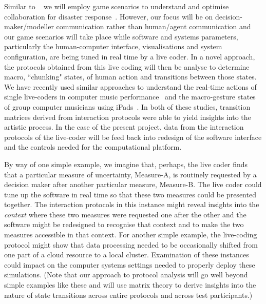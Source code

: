 \documentclass[a4paper,fontsize=12pt]{scrartcl}
\begin{document}
Similar to ~\parencite{ramchurn2016human} we will employ game scenarios to understand and optimise 
collaboration for disaster response~\parencite{ramchurn2016human}.
However, our focus will be on  decision-maker/modeller communication rather than human/agent communication and our game scenarios will take place while software and systems parameters, particularly the human-computer interface, visualisations and system configuration, are being tuned in real time by a live coder.  
In a novel approach, the protocols obtained from this live coding will then be analyse to determine macro, ``chunking" states, of human action and transitions between those states. 
We have recently used similar approaches to understand the real-time actions of single live-coders in computer music performance~\parencite{swift2014coding} and the macro-gesture states of group computer musicians using iPads~\parencite{martin2015tracking}. 
In both of these studies, transition matrices derived from interaction protocols were able to yield insights into the artistic process. 
In the case of the present project, data from the interaction protocols of the live-coder will be feed back into redesign of the software interface and the controls needed for the computational platform.

By way of one simple example, we imagine that, perhaps, the live coder finds that a particular measure of uncertainty, Measure-A, is routinely requested by a decision maker after another particular measure, Measure-B. The live coder could tune up the software in real time so that these two measures could be presented together. The interaction protocols in this instance might reveal insights into the {\em context} where these two measures were requested one after the other and the software might be redesigned to recognise that context and to make the two measures accessible in that context. For another simple example, the live-coding protocol might show that data processing needed to be occasionally shifted from one part of a cloud resource to a local cluster. Examination of these instances could impact on the computer systems settings needed to properly deploy these simulations. (Note that our approach to protocol analysis will go well beyond simple examples like these and will use matrix theory to derive insights into the nature of state transitions across entire protocols and across test participants.)\\


\\
\end{document}
